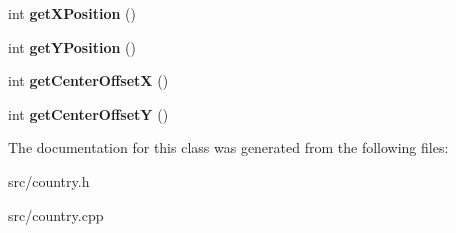 \begin{DoxyCompactItemize}
\item 
\hypertarget{class_country_ac65b448259ef1d4fc18317b7884a6646}{}int {\bfseries get\+X\+Position} ()\label{class_country_ac65b448259ef1d4fc18317b7884a6646}

\item 
\hypertarget{class_country_a71b28d091bb05451d943743468e79325}{}int {\bfseries get\+Y\+Position} ()\label{class_country_a71b28d091bb05451d943743468e79325}

\item 
\hypertarget{class_country_a0f7e5ff5dbcf7ad7864254f87ae0d241}{}int {\bfseries get\+Center\+Offset\+X} ()\label{class_country_a0f7e5ff5dbcf7ad7864254f87ae0d241}

\item 
\hypertarget{class_country_ac263fa8d4adfc1ee2d8fee8860667d68}{}int {\bfseries get\+Center\+Offset\+Y} ()\label{class_country_ac263fa8d4adfc1ee2d8fee8860667d68}

\end{DoxyCompactItemize}


The documentation for this class was generated from the following files\+:\begin{DoxyCompactItemize}
\item 
src/country.\+h\item 
src/country.\+cpp\end{DoxyCompactItemize}

